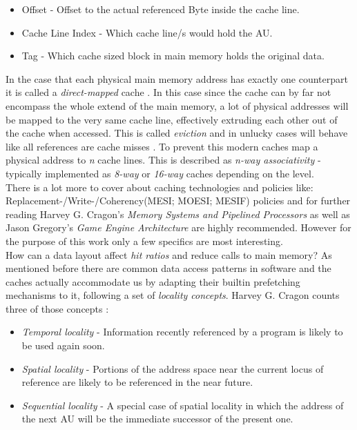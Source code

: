 \begin{itemize}
	\item Offset - Offset to the actual referenced Byte inside the cache line.
	\item Cache Line Index - Which cache line/s would hold the AU.
	\item Tag - Which cache sized block in main memory holds the original data.
\end{itemize}
In the case that each physical main memory address has exactly one counterpart it is called a \textit{direct-mapped} cache . In this case since the cache can by far not encompass the whole extend of the main memory, a lot of physical addresses will be mapped to the very same cache line, effectively extruding each other out of the cache when accessed. This is called \textit{eviction} and in unlucky cases will behave like all references are cache misses . To prevent this modern caches map a physical address to \textit{n} cache lines. This is described as \textit{n-way associativity} - typically implemented as \textit{8-way} or \textit{16-way} caches depending on the level.\\
There is a lot more to cover about caching technologies and policies like: Replacement-/Write-/Coherency(MESI; MOESI; MESIF) policies and for further reading Harvey G. Cragon's \textit{Memory Systems and Pipelined Processors} as well as Jason Gregory's \textit{Game Engine Architecture} are highly recommended. However for the purpose of this work only a few specifics are most interesting.\\
How can a data layout affect \textit{hit ratios} and reduce calls to main memory? As mentioned before there are common data access patterns in software and the caches actually accommodate us by adapting their builtin prefetching mechanisms to it, following a set of \textit{locality concepts}. Harvey G. Cragon counts three of those concepts :
\begin{itemize}
	\item \textit{Temporal locality} - Information recently referenced by a program is likely to be used again soon.
	\item \textit{Spatial locality} - Portions of the address space near the current locus of reference are likely to be referenced in the near future.
	\item \textit{Sequential locality} - A special case of spatial locality in which the address of the next AU will be the immediate successor of the present one.
\end{itemize}

